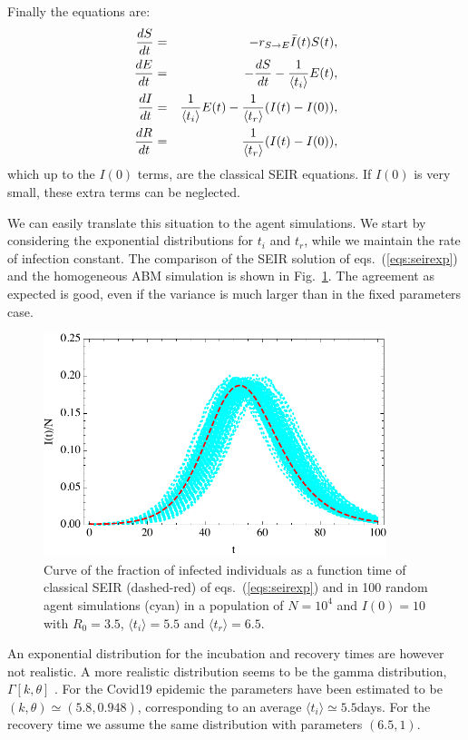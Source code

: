 \documentclass[a4paper,oneside,11pt]{article}
\begin{document}
Finally the equations are:
\begin{eqnarray}
{d S\over dt} &=& - r_{S\rightarrow E} \bar{I}(t) S(t),\nonumber\\
{d E\over dt} &=& -{d S\over d t} -{1 \over \langle t_i\rangle} E(t) ,\nonumber\\
{d I\over dt} &=& {1 \over \langle t_i\rangle} E(t) - {1\over  \langle t_r \rangle} (I(t) -I(0)),\nonumber\\
{d R\over d t} &=&  {1\over  \langle t_r\rangle} (I(t)-I(0)),\nonumber\\
\label{eqs:seirexp}
\end{eqnarray}
which up to the $I(0)$ terms, are the classical SEIR equations. If $I(0)$ is very small, these extra terms can  be neglected.

We can easily translate this situation to the agent simulations.
We start by considering the exponential distributions for $t_i$ and $t_r$, while we maintain the rate of infection constant. The comparison of the SEIR solution of eqs.~(\ref{eqs:seirexp}) and the homogeneous ABM simulation is shown in Fig.~\ref{fig:exp}. The agreement as expected is good, even if the variance is much larger than in the fixed parameters case.
\begin{figure}[h!]
  \centering
  \includegraphics[width=10cm]{expseir.pdf}
  \caption{ Curve of the fraction of infected individuals as a function time of  classical SEIR (dashed-red) of eqs.~(\ref{eqs:seirexp}) and in 100 random agent simulations (cyan) in a  population of $N=10^4$ and $I(0)=10$ with $R_0=3.5$, $\langle t_i\rangle=5.5$ and $\langle t_r\rangle=6.5$.  }
  \label{fig:exp}
   \end{figure}

 An exponential distribution for the incubation and recovery times are however not realistic. A more realistic distribution seems to be the  gamma distribution, $\Gamma[k,\theta]$ \cite{}. For the Covid19 epidemic the parameters have been estimated to be $(k,\theta) \simeq (5.8, 0.948)$, corresponding to an average $\langle t_i\rangle \simeq 5.5$days. For the recovery time we assume the same distribution with parameters $(6.5,1)$.
\end{document}
